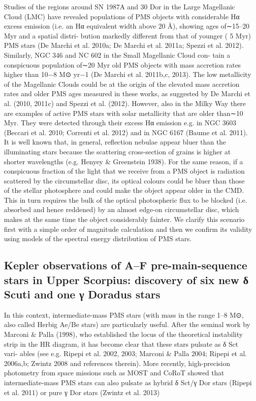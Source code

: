 \documentclass[../main.tex]{subfiles}
\begin{document}
{Studies of the regions around SN 1987A and 30 Dor in the
Large Magellanic Cloud (LMC) have revealed populations of PMS
objects with considerable Hα excess emission (i.e. an Hα equivalent
width above 20 Å), showing ages of∼15–20 Myr and a spatial distri-
bution markedly different from that of younger ( 5 Myr) PMS stars
(De Marchi et al. 2010a; De Marchi et al. 2011a; Spezzi et al. 2012).
Similarly, NGC 346 and NC 602 in the Small Magellanic Cloud con-
tain a conspicuous population of∼20 Myr old PMS objects with
mass accretion rates higher than 10−8 M⊙ yr−1 (De Marchi et al.
2011b,c, 2013). The low metallicity of the Magellanic Clouds could be at the
origin of the elevated mass accretion rates and older PMS ages
measured in these works, as suggested by De Marchi et al. (2010,
2011c) and Spezzi et al. (2012). However, also in the Milky Way
there are examples of active PMS stars with solar metallicity that
are older than∼10 Myr. They were detected through their excess
Hα emission e.g. in NGC 3603 (Beccari et al. 2010; Correnti et al.
2012) and in NGC 6167 (Baume et al. 2011).
It is well known that, in general, reflection nebulae appear bluer
than the illuminating stars because the scattering cross-section of
grains is higher at shorter wavelengths (e.g. Henyey & Greenstein
1938). For the same reason, if a conspicuous fraction of the light
that we receive from a PMS object is radiation scattered by the
circumstellar disc, its optical colours could be bluer than those of
the stellar photosphere and could make the object appear older in
the CMD. This in turn requires the bulk of the optical photospheric
flux to be blocked (i.e. absorbed and hence reddened) by an almost
edge-on circumstellar disc, which makes at the same time the object
considerably fainter. We clarify this scenario first with a simple
order of magnitude calculation and then we confirm its validity
using models of the spectral energy distribution of PMS stars.
\subsection{Kepler observations of A–F pre-main-sequence stars in Upper Scorpius:
	discovery of six new δ Scuti and one γ Doradus stars}

In this context, intermediate-mass PMS stars (with mass in the
range 1–8 M⊙, also called Herbig Ae/Be stars) are particularly
useful. After the seminal work by Marconi & Palla (1998), who
established the locus of the theoretical instability strip in the HR
diagram, it has become clear that these stars pulsate as δ Sct vari-
ables (see e.g. Ripepi et al. 2002, 2003; Marconi & Palla 2004;
Ripepi et al. 2006a,b; Zwintz 2008 and references therein). More
recently, high-precision photometry from space missions such as MOST and CoRoT showed that   intermediate-mass PMS stars can
also pulsate as hybrid δ Sct/γ Dor stars (Ripepi et al. 2011) or pure
γ Dor stars (Zwintz et al. 2013)

}
\end{document}

